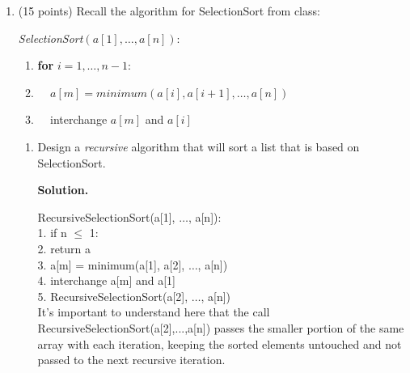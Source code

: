 \documentclass[10pt,letterpaper,unboxed,cm]{article}
\newcommand{\ind}{$~~~~~$}
\newenvironment{solution}
  {\par\medskip\noindent\textbf{Solution.}\ }
  {\par\medskip}
\begin{document}
\begin{enumerate}
\begin{enumerate}
\begin{solution}
\end{solution}

\item
Suppose an algorithm solves a problem of size $n$ by recursively calling $3$ subproblems each of size $n/9$. Then the non-recursive part of the algorithm takes $O(n^2)$ time.

\begin{solution}
	
	Applying the same logic:\\
	T(n) = 3*T(n/9) + O($n^2$).\\
	Here: a = 3, b = 9, d = 2.\\
	Then, $b^d = 9^2 = 81$.\\
	Since $a < b^d$, first row applies:\\
	$\boxed{T(n) = O(n^2)}$.
 
\end{solution}

\end{enumerate}

	\item (15 points)
Recall the algorithm for SelectionSort from class:

\emph{SelectionSort}$(a[1],\dots,a[n])$:
\begin{enumerate}[1.]
\item {\bf for} $i=1,\dots,n-1$:
\item \ind $a[m] = minimum(a[i],a[i+1],\dots,a[n])$
\item \ind interchange $a[m]$ and $a[i]$
\end{enumerate}

\begin{enumerate}
\item

Design a \emph{recursive} algorithm that will sort a list that is based on SelectionSort.

\begin{solution}
	
	RecursiveSelectionSort(a[1], $\dots$, a[n]):\\
	1. if n $\leq$ 1:\\
	2. \hspace*{2em}return a\\
	3. a[m] = minimum(a[1], a[2], $\dots$, a[n])\\
	4. interchange a[m] and a[1]\\
	5. RecursiveSelectionSort(a[2], $\dots$, a[n])\\
	It's important to understand here that the call RecursiveSelectionSort(a[2],...,a[n]) passes the smaller portion of the same array with each iteration, keeping the sorted elements untouched and not passed to the next recursive iteration.


\end{solution}
\end{enumerate}
\end{enumerate}
\end{document}
